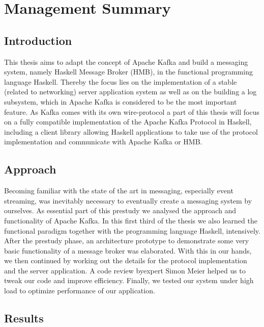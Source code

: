 \chapter{Management Summary}

\section*{Introduction}

This thesis aims to adapt the concept of Apache Kafka and build a messaging
system, namely Haskell Message Broker (HMB), in the functional programming
language Haskell. Thereby the focus lies on the implementation of a stable
(related to networking) server application system as well as on the building a
log subsystem, which in Apache Kafka is considered to be the most important
feature. As Kafka comes with its own wire-protocol a part of this thesis will
focus on a fully compatible implementation of the Apache Kafka Protocol in
Haskell, including a client library allowing Haskell applications to take use of
the protocol implementation and communicate with Apache Kafka or HMB.

\section*{Approach}

Becoming familiar with the state of the art in messaging, especially event
streaming, was inevitably necessary to eventually create a messaging system by
ourselves. As essential part of this prestudy we analysed the approach and
functionality of Apache Kafka. In this first third of the thesis we also learned
the functional paradigm together with the programming language Haskell,
intensively. After the prestudy phase, an architecture prototype to demonstrate
some very basic functionality of a message broker was elaborated. With this in
our hands, we then continued by working out the details for the protocol
implementation and the server application. A code review byexpert Simon Meier
helped us to tweak our code and improve efficiency. Finally, we tested our
system under high load to optimize performance of our application.

\section*{Results}

